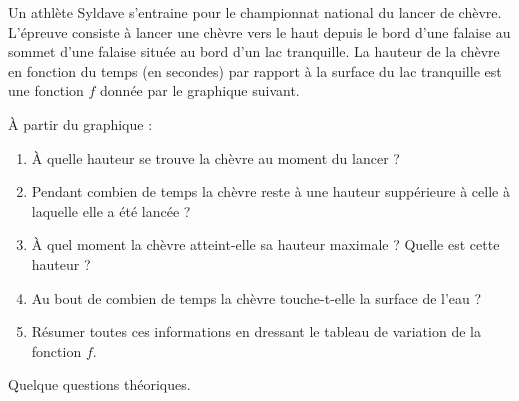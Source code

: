 
\begin{exercice}\label{exosmath-0238}

    Un athlète Syldave s'entraine pour le championnat national du lancer de chèvre. L'épreuve consiste à lancer une chèvre vers le haut depuis le bord d'une falaise au sommet d'une falaise située au bord d'un lac tranquille. La hauteur de la chèvre en fonction du temps (en secondes) par rapport à la surface du lac tranquille est une fonction \( f\) donnée par le graphique suivant.

    \begin{center}

    \end{center}
    À partir du graphique :
    \begin{enumerate}
        \item
            À quelle hauteur se trouve la chèvre au moment du lancer ?
        \item
            Pendant combien de temps la chèvre reste à une hauteur suppérieure à celle à laquelle elle a été lancée ?
        \item
            À quel moment la chèvre atteint-elle sa hauteur maximale ? Quelle est cette hauteur ?
        \item
            Au bout de combien de temps la chèvre touche-t-elle la surface de l'eau ?
        \item
            Résumer toutes ces informations en dressant le tableau de variation de la fonction \( f\).
    \end{enumerate}
    Quelque questions théoriques.

\end{exercice}
